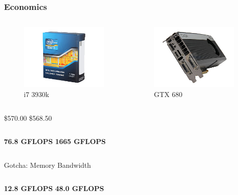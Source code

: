 \documentclass[12pt]{beamer}
\begin{document}
\begin{frame}
\frametitle{Economics}
\begin{columns}
\begin{figure}
\includegraphics[width=.75\textwidth]{img/i73930k.png}
\caption{i7 3930k}
\end{figure}
\begin{figure}
\includegraphics[width=.75\textwidth]{img/gtx680.png}
\caption{GTX 680}
\end{figure}
\end{columns}
\pause
\begin{columns}
\centering
\$570.00
\centering
\$568.50
\end{columns}
\pause
\begin{columns}
\centering
\textbf{76.8 GFLOPS}
\centering
\textbf{1665 GFLOPS}
\end{columns}
\pause
\begin{block}{Gotcha: Memory Bandwidth}
\begin{columns}
\centering
\textbf{12.8 GFLOPS}
\centering
\textbf{48.0 GFLOPS}
\end{columns}
\end{block}
\end{frame}
\end{document}

